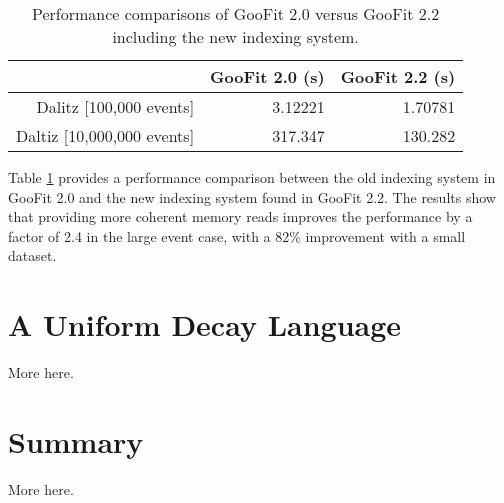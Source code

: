 \documentclass{webofc}
\begin{document}
\begin{table}
	\centering
	\begin{tabular}{ |r|r|r| }
		\hline
			 & GooFit 2.0 (s) & GooFit 2.2 (s) \\
		\hline
			Dalitz [100,000 events] & 3.12221 & 1.70781 \\
		\hline
			Daltiz [10,000,000 events] & 317.347 & 130.282 \\
		\hline
	\end{tabular}
	\caption{Performance comparisons of GooFit 2.0 versus GooFit 2.2 including the new indexing system.}
	\label{table:1}
\end{table}

Table \ref{table:1} provides a performance comparison between the old indexing system in GooFit 2.0 and the new indexing system found in GooFit 2.2. The results show that providing more coherent memory reads improves the performance by a factor of 2.4 in the large event case, with a 82\% improvement with a small dataset.

\section{A Uniform Decay Language}
\label{sec-ampgen}
More here.


\section{Summary}
\label{sec-summary}
More here.


%
\end{document}
